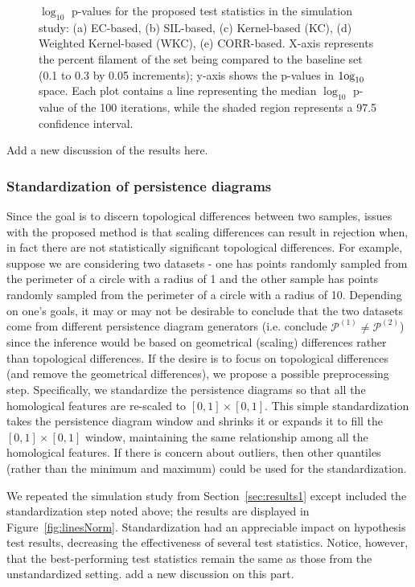 \documentclass[12pt]{article}
\begin{document}
\begin{center}
\begin{figure}[htp!]
\begin{subfigure}{.45\textwidth}
      \label{fig:sub_corr}
    \end{subfigure}
  \caption{$\log_{10}$ p-values for the proposed test statistics in the simulation study: (a) EC-based, (b) SIL-based, (c) Kernel-based (KC), (d) Weighted Kernel-based (WKC), (e) CORR-based. X-axis represents the percent filament of the set being compared to the baseline set (0.1 to 0.3 by 0.05 increments); y-axis shows the p-values in $\textup{1og}_{10}$ space. Each plot contains a line representing the median $\log_{10}$ p-value of the 100 iterations, while the shaded region represents a 97.5 confidence interval.}
  \label{fig:sub_unstandardized_results}
  \end{figure}
\end{center}

{\color{red} Add a new discussion of the results here.} 

\subsubsection{Standardization of persistence diagrams} \label{sec:standardize}
Since the goal is to discern topological differences between two samples, issues with the proposed method is that scaling differences can result in rejection when, in fact there are not statistically significant topological differences.  For example, suppose we are considering two datasets - one has points randomly sampled from the perimeter of a circle with a radius of 1 and the other sample has points randomly sampled from the perimeter of a circle with a radius of 10.  Depending on one's goals, it may or may not be desirable to conclude that the two datasets come from different persistence diagram generators (i.e. conclude $\mathcal P^{(1)} \neq \mathcal P^{(2)}$) since the inference would be based on geometrical (scaling) differences rather than topological differences.  If the desire is to focus on topological differences (and remove the geometrical differences), we propose a possible preprocessing step.
Specifically, we standardize the persistence diagrams so that all the homological features are re-scaled to $[0, 1]\times[0,1]$.  This simple standardization takes the persistence diagram window and shrinks it or expands it to fill the $[0, 1]\times[0,1]$ window, maintaining the same relationship among all the homological features.  If there is concern about outliers, then other quantiles (rather than the minimum and maximum) could be used for the standardization.

We repeated the simulation study from Section~\ref{sec:results1} except included the standardization step noted above; the results are displayed in Figure~\ref{fig:linesNorm}.
Standardization had an appreciable impact on hypothesis test results, decreasing the effectiveness of several test statistics. Notice, however, that the best-performing test statistics remain the same as those from the unstandardized setting. 
{\color{red} add a new discussion on this part.} 
\end{document}
